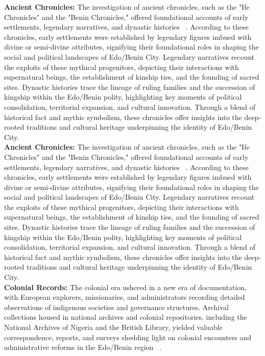 \noindent\textbf{Ancient Chronicles:} The investigation of ancient chronicles, such as the "Ife Chronicles" and the "Benin Chronicles," offered foundational accounts of early settlements, legendary narratives, and dynastic histories ~\cite{otterbein1966}. According to these chronicles, early settlements were established by legendary figures imbued with divine or semi-divine attributes, signifying their foundational roles in shaping the social and political landscapes of Edo/Benin City. Legendary narratives recount the exploits of these mythical progenitors, depicting their interactions with supernatural beings, the establishment of kinship ties, and the founding of sacred sites. Dynastic histories trace the lineage of ruling families and the succession of kingship within the Edo/Benin polity, highlighting key moments of political consolidation, territorial expansion, and cultural innovation. Through a blend of historical fact and mythic symbolism, these chronicles offer insights into the deep-rooted traditions and cultural heritage underpinning the identity of Edo/Benin City.\\[-2mm]

\noindent\textbf{Ancient Chronicles:} The investigation of ancient chronicles, such as the "Ife Chronicles" and the "Benin Chronicles," offered foundational accounts of early settlements, legendary narratives, and dynastic histories ~\cite{otterbein1966}. According to these chronicles, early settlements were established by legendary figures imbued with divine or semi-divine attributes, signifying their foundational roles in shaping the social and political landscapes of Edo/Benin City. Legendary narratives recount the exploits of these mythical progenitors, depicting their interactions with supernatural beings, the establishment of kinship ties, and the founding of sacred sites. Dynastic histories trace the lineage of ruling families and the succession of kingship within the Edo/Benin polity, highlighting key moments of political consolidation, territorial expansion, and cultural innovation. Through a blend of historical fact and mythic symbolism, these chronicles offer insights into the deep-rooted traditions and cultural heritage underpinning the identity of Edo/Benin City.\\[-2mm]

\noindent\textbf{Colonial Records:} The colonial era ushered in a new era of documentation, with European explorers, missionaries, and administrators recording detailed observations of indigenous societies and governance structures. Archival collections housed in national archives and colonial repositories, including the National Archives of Nigeria and the British Library, yielded valuable correspondence, reports, and surveys shedding light on colonial encounters and administrative reforms in the Edo/Benin region ~\cite{oliver1985}.\\[-2mm]

